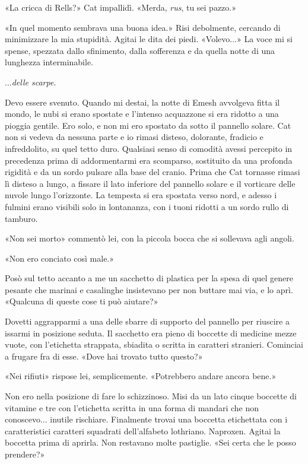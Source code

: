 «La cricca di Rells?» Cat impallidì. «Merda, \emph{rus}, tu sei pazzo.»

«In quel momento sembrava una buona idea.» Risi debolmente, cercando di
minimizzare la mia stupidità. Agitai le dita dei piedi. «Volevo...» La
voce mi si spense, spezzata dallo sfinimento, dalla sofferenza e da
quella notte di una lunghezza interminabile.

...\emph{delle scarpe}.

\begin{figure}
	\centering
	\def\svgwidth{\columnwidth}
	\scalebox{0.2}{}
\end{figure}

Devo essere svenuto. Quando mi destai, la notte di Emesh avvolgeva fitta
il mondo, le nubi si erano spostate e l'intenso acquazzone si era
ridotto a una pioggia gentile. Ero solo, e non mi ero spostato da sotto
il pannello solare. Cat non si vedeva da nessuna parte e io rimasi
disteso, dolorante, fradicio e infreddolito, su quel tetto duro.
Qualsiasi senso di comodità avessi percepito in precedenza prima di
addormentarmi era scomparso, sostituito da una profonda rigidità e da un
sordo pulsare alla base del cranio. Prima che Cat tornasse rimasi lì
disteso a lungo, a fissare il lato inferiore del pannello solare e il
vorticare delle nuvole lungo l'orizzonte. La tempesta si era spostata
verso nord, e adesso i fulmini erano visibili solo in lontananza, con i
tuoni ridotti a un sordo rullo di tamburo.

«Non sei morto» commentò lei, con la piccola bocca che si sollevava agli
angoli.

«Non ero conciato così male.»

Posò sul tetto accanto a me un sacchetto di plastica per la spesa di
quel genere pesante che marinai e casalinghe insistevano per non buttare
mai via, e lo aprì. «Qualcuna di queste cose ti può aiutare?»

Dovetti aggrapparmi a una delle sbarre di supporto del pannello per
riuscire a issarmi in posizione seduta. Il sacchetto era pieno di
boccette di medicine mezze vuote, con l'etichetta strappata, sbiadita o
scritta in caratteri stranieri. Cominciai a frugare fra di esse. «Dove
hai trovato tutto questo?»

«Nei rifiuti» rispose lei, semplicemente. «Potrebbero andare ancora
bene.»

Non ero nella posizione di fare lo schizzinoso. Misi da un lato cinque
boccette di vitamine e tre con l'etichetta scritta in una forma di
mandari che non conoscevo... inutile rischiare. Finalmente trovai una
boccetta etichettata con i caratteristici caratteri squadrati
dell'alfabeto lothriano. Naproxen. Agitai la boccetta prima di aprirla.
Non restavano molte pastiglie. «Sei certa che le posso prendere?»

